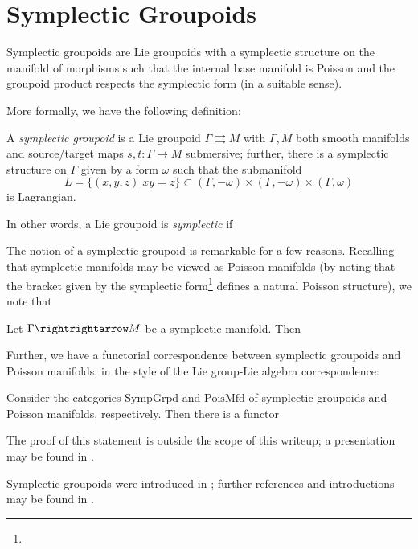 \section{Symplectic Groupoids}
Symplectic groupoids are Lie groupoids with a symplectic structure on the manifold of morphisms such that the internal base manifold is Poisson and the groupoid product respects the symplectic form (in a suitable sense).

More formally, we have the following definition:
\begin{defn}
A \emph{symplectic groupoid} is a Lie groupoid $\Gamma \rightrightarrows M$ with $\Gamma, M$ both smooth manifolds and source/target maps $s,t: \Gamma \to M$ submersive; further, there is a symplectic structure on $\Gamma$ given by a form $\omega$ such that the submanifold
$$
L = \{(x,y,z) | xy = z \} \subset (\Gamma,-\omega) \times (\Gamma,-\omega) \times (\Gamma,\omega)
$$
is Lagrangian.

In other words, a Lie groupoid is \emph{symplectic} if %
\end{defn}

The notion of a symplectic groupoid is remarkable for a few reasons. Recalling that symplectic manifolds may be viewed as Poisson manifolds (by noting that the bracket given by the symplectic form\footnote{} defines a natural Poisson structure), we note that %
\begin{thrm}
Let $\Gamma \rightrightarrow M$ be a symplectic manifold. Then %
\end{thrm}

Further, we have a functorial correspondence between symplectic groupoids and Poisson manifolds, in the style of the Lie group-Lie algebra correspondence:
\begin{thrm}
Consider the categories $\mathrm{SympGrpd}$ and $\mathrm{PoisMfd}$ of symplectic groupoids and Poisson manifolds, respectively. Then there is a functor %
\end{thrm}
The proof of this statement is outside the scope of this writeup; a presentation may be found in \cite{SOMETHING HERE}. %

Symplectic groupoids were introduced in \cite{weinstein87}; further references and introductions may be found in \cite{SOMETHING HERE}.